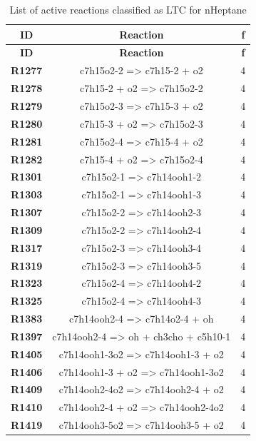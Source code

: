 \begin{longtable}{ccc}
\caption{List of active reactions classified as LTC for nHeptane}\\
\hline
\textbf{ID} & \textbf{Reaction} & \textbf{f} \\
\hline
\endfirsthead
\hline
\textbf{ID} & \textbf{Reaction} & \textbf{f} \\
\hline
\endhead
\textbf{R1277} & c7h15o2-2 =\textgreater{} c7h15-2 + o2 & 4 \\
\textbf{R1278} & c7h15-2 + o2 =\textgreater{} c7h15o2-2 & 4 \\
\textbf{R1279} & c7h15o2-3 =\textgreater{} c7h15-3 + o2 & 4 \\
\textbf{R1280} & c7h15-3 + o2 =\textgreater{} c7h15o2-3 & 4 \\
\textbf{R1281} & c7h15o2-4 =\textgreater{} c7h15-4 + o2 & 4 \\
\textbf{R1282} & c7h15-4 + o2 =\textgreater{} c7h15o2-4 & 4 \\
\textbf{R1301} & c7h15o2-1 =\textgreater{} c7h14ooh1-2 & 4 \\
\textbf{R1303} & c7h15o2-1 =\textgreater{} c7h14ooh1-3 & 4 \\
\textbf{R1307} & c7h15o2-2 =\textgreater{} c7h14ooh2-3 & 4 \\
\textbf{R1309} & c7h15o2-2 =\textgreater{} c7h14ooh2-4 & 4 \\
\textbf{R1317} & c7h15o2-3 =\textgreater{} c7h14ooh3-4 & 4 \\
\textbf{R1319} & c7h15o2-3 =\textgreater{} c7h14ooh3-5 & 4 \\
\textbf{R1323} & c7h15o2-4 =\textgreater{} c7h14ooh4-2 & 4 \\
\textbf{R1325} & c7h15o2-4 =\textgreater{} c7h14ooh4-3 & 4 \\
\textbf{R1383} & c7h14ooh2-4 =\textgreater{} c7h14o2-4 + oh & 4 \\
\textbf{R1397} & c7h14ooh2-4 =\textgreater{} oh + ch3cho + c5h10-1 & 4 \\
\textbf{R1405} & c7h14ooh1-3o2 =\textgreater{} c7h14ooh1-3 + o2 & 4 \\
\textbf{R1406} & c7h14ooh1-3 + o2 =\textgreater{} c7h14ooh1-3o2 & 4 \\
\textbf{R1409} & c7h14ooh2-4o2 =\textgreater{} c7h14ooh2-4 + o2 & 4 \\
\textbf{R1410} & c7h14ooh2-4 + o2 =\textgreater{} c7h14ooh2-4o2 & 4 \\
\textbf{R1419} & c7h14ooh3-5o2 =\textgreater{} c7h14ooh3-5 + o2 & 4 \\

\end{longtable}
